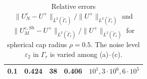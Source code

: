 \documentclass[a4paper, 10pt]{article}
\numberwithin{equation}{section}
\theoremstyle{definition}
\begin{document}
\begin{table}
\begin{tabular}{ | c || c | c || c | c | }
	0.1 & 0.424 & 38 & 0.406 &  $10^1, 3\cdot 10^6, 6\cdot10^5$\\
	\hline
\end{tabular}

\caption{Relative errors $\|U_N^\varepsilon-U^+\|_{L^2(\tilde{\Gamma}_r)}/\|U^+\|_{L^2(\tilde{\Gamma}_r)}$ and $\|U_M^{\varepsilon,Sh}-U^+\|_{L^2(\tilde{\Gamma}_r)}/\|U^+\|_{L^2(\tilde{\Gamma}_r)}$  for spherical cap radius $\rho=0.5$. The noise level $\varepsilon_2$ in $\Gamma_r$ is varied among (a)--(c).}\label{tab:err1}
\end{table}
\end{document}
